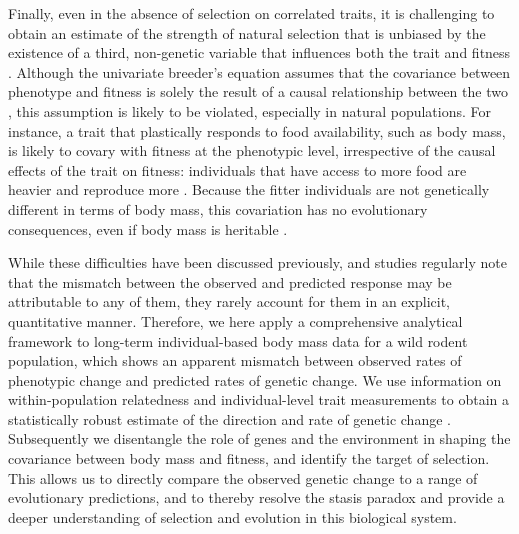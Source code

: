 Finally, even in the absence of selection on correlated traits, it is challenging to obtain an estimate of the strength of natural selection that is unbiased by the existence of a third, non-genetic variable that influences both the trait and fitness \parencite{Rausher1992}. Although the univariate breeder's equation assumes that the covariance between phenotype and fitness is solely the result of a causal relationship between the two \parencite{Morrissey2010,Morrissey2012sts}, this assumption is likely to be violated, especially in natural populations. For instance, a trait that plastically responds to food availability, such as body mass,  is likely to covary with fitness at the phenotypic level, irrespective of the causal effects of the trait on fitness: individuals that have access to more food are heavier and reproduce more \parencite{VanNoordwijk1988a,Schluter1991}. Because the fitter individuals are not genetically different in terms of body mass, this covariation has no evolutionary consequences, even if body mass is heritable \parencite{Rausher1992}. 

While these difficulties have been discussed previously, and studies regularly note that the mismatch between the observed and predicted response may be attributable to any of them, they rarely account for them in an explicit, quantitative manner. Therefore, we here apply a comprehensive analytical framework to long-term individual-based body mass data for a wild rodent population, which shows an apparent mismatch between observed rates of phenotypic change and predicted rates of genetic change. We use information on within-population relatedness and individual-level trait measurements \parencite{Henderson1950,Lynch1998} to obtain a statistically robust estimate of the direction and rate of genetic change \parencite{Postma2006,Hadfield2010b,Morrissey2012sts}. Subsequently we disentangle the role of genes and the environment in shaping the covariance between body mass and fitness, and identify the target of selection. This allows us to directly compare the observed genetic change to a range of evolutionary predictions, and to thereby resolve the stasis paradox and provide a deeper understanding of selection and evolution in this biological system. 

